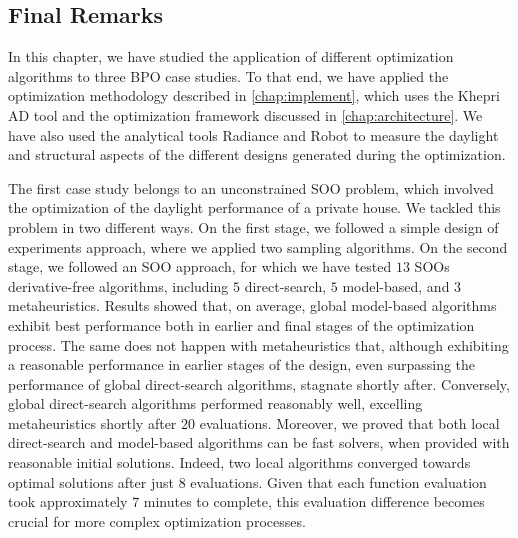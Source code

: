 \subsection{Final Remarks}

In this chapter, we have studied the application of different optimization algorithms to three \ac{BPO} case studies. To that end, we have applied the optimization methodology described in \cref{chap:implement}, which uses the Khepri \ac{AD} tool and the optimization framework discussed in \cref{chap:architecture}. We have also used the analytical tools Radiance and Robot to measure the daylight and structural aspects of the different designs generated during the optimization.

The first case study belongs to an unconstrained \ac{SOO} problem, which involved the optimization of the daylight performance of a private house. We tackled this problem in two different ways. On the first stage, we followed a simple design of experiments approach, where we applied two sampling algorithms. On the second stage, we followed an \ac{SOO} approach, for which we have tested $13$ \acp{SOO} derivative-free algorithms, including $5$ direct-search, $5$ model-based, and $3$ metaheuristics. Results showed that, on average, global model-based algorithms exhibit best performance both in earlier and final stages of the optimization process. The same does not happen with metaheuristics that, although exhibiting a reasonable performance in earlier stages of the design, even surpassing the performance of global direct-search algorithms, stagnate shortly after. Conversely, global direct-search algorithms performed reasonably well, excelling metaheuristics shortly after $20$ evaluations. Moreover, we proved that both local direct-search and model-based algorithms can be fast solvers, when provided with reasonable initial solutions. Indeed, two local algorithms converged towards optimal solutions after just $8$ evaluations. Given that each function evaluation took approximately $7$ minutes to complete, this evaluation difference becomes crucial for more complex optimization processes.


